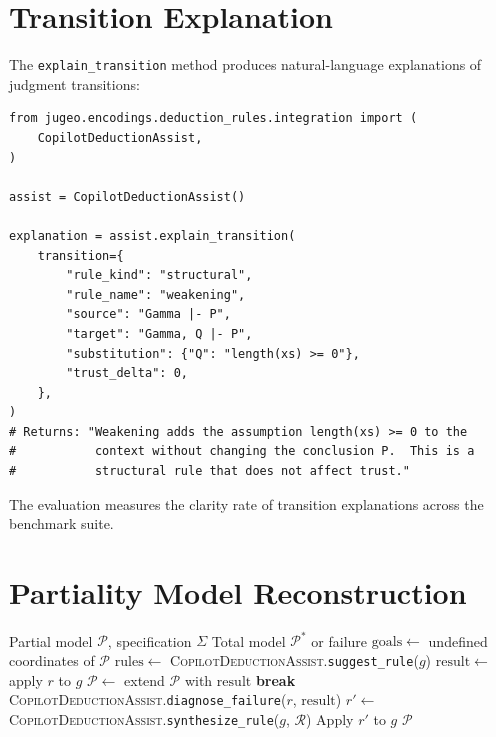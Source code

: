 \documentclass[11pt]{article}
\newcommand{\DeducAssist}{\textsc{CopilotDeductionAssist}}
\newcommand{\partmodel}{\mathcal{P}}
\newcommand{\rulelib}{\mathcal{R}}
\begin{document}
\section{Transition Explanation}\label{sec:explain}

The \texttt{explain\_transition} method produces natural-language explanations
of judgment transitions:

\begin{lstlisting}[style=jugeo-python]
from jugeo.encodings.deduction_rules.integration import (
    CopilotDeductionAssist,
)

assist = CopilotDeductionAssist()

explanation = assist.explain_transition(
    transition={
        "rule_kind": "structural",
        "rule_name": "weakening",
        "source": "Gamma |- P",
        "target": "Gamma, Q |- P",
        "substitution": {"Q": "length(xs) >= 0"},
        "trust_delta": 0,
    },
)
# Returns: "Weakening adds the assumption length(xs) >= 0 to the
#           context without changing the conclusion P.  This is a
#           structural rule that does not affect trust."
\end{lstlisting}

The evaluation measures the clarity rate of transition explanations across
the benchmark suite.

\section{Partiality Model Reconstruction}\label{sec:reconstruction}

\begin{algorithm}[h]
\caption{Copilot-Assisted Partiality Reconstruction}
\label{alg:reconstruct}
\begin{algorithmic}[1]
\REQUIRE Partial model $\partmodel$, specification $\Sigma$
\ENSURE Total model $\partmodel^*$ or failure
\STATE $\mathrm{goals} \gets$ undefined coordinates of $\partmodel$
  \STATE $\mathrm{rules} \gets$ \DeducAssist.\texttt{suggest\_rule}($g$)
    \STATE $\mathrm{result} \gets$ apply $r$ to $g$
      \STATE $\partmodel \gets$ extend $\partmodel$ with $\mathrm{result}$
      \STATE \textbf{break}
    \ELSE
      \STATE \DeducAssist.\texttt{diagnose\_failure}($r$, $\mathrm{result}$)
    \ENDIF
  \ENDFOR
    \STATE $r' \gets$ \DeducAssist.\texttt{synthesize\_rule}($g$, $\rulelib$)
    \STATE Apply $r'$ to $g$
  \ENDIF
\ENDFOR
\RETURN $\partmodel$
\end{algorithmic}
\end{algorithm}
\end{document}
